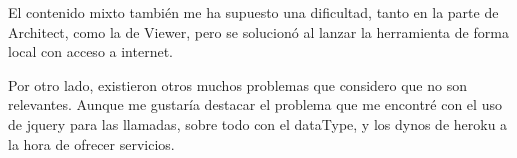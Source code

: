El contenido mixto también me ha supuesto una dificultad, tanto en la parte de Architect, como la de Viewer, pero se solucionó al lanzar la herramienta de forma local con acceso a internet. 

Por otro lado, existieron otros muchos problemas que considero que no son relevantes. Aunque me gustaría destacar el problema que me encontré con el uso de jquery para las llamadas, sobre todo con el dataType, y los dynos de heroku a la hora de ofrecer servicios.
